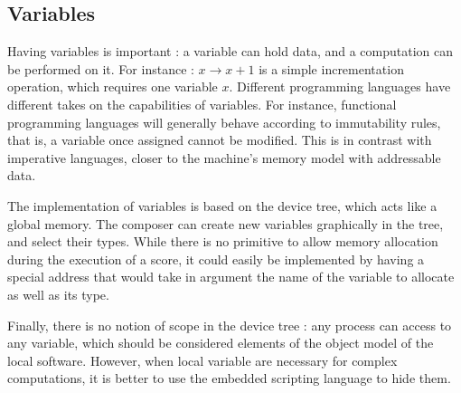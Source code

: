 \documentclass{article}
\begin{document}
\subsection{Variables}
Having variables is important : a variable can hold data, 
and a computation can be performed on it.
For instance : $x \rightarrow x + 1$ is a simple incrementation 
operation, which requires one variable $x$.
Different programming languages have different takes on the 
capabilities of variables.
For instance, functional programming languages will generally 
behave according to immutability rules, that is, a variable once 
assigned cannot be modified.
This is in contrast with imperative languages, closer 
to the machine's memory model with addressable data.

The implementation of variables is based on the device tree, which 
acts like a global memory. 
The composer can create new variables graphically in the tree, and select their types.
While there is no primitive to allow memory allocation during the execution of a score, it could easily be implemented by having a special address that would take in argument the name of the variable to allocate as well as its type.

Finally, there is no notion of scope in the device tree : any process can access to any variable, which 
should be considered elements of the object model of the local software.
However, when local variable are necessary for complex computations, it 
is better to use the embedded scripting language to hide them.
\end{document}
